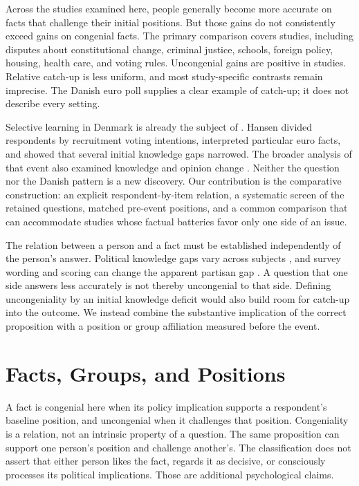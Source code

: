 \documentclass[11pt]{article}
\begin{document}
Across the studies examined here, people generally become more accurate on facts that challenge their initial positions. But those gains do not consistently exceed gains on congenial facts. The primary comparison covers \primaryStudies{} studies, including disputes about constitutional change, criminal justice, schools, foreign policy, housing, health care, and voting rules. Uncongenial gains are positive in \positiveGainStudies{} studies. Relative catch-up is less uniform, and most study-specific contrasts remain imprecise. The Danish euro poll supplies a clear example of catch-up; it does not describe every setting.

Selective learning in Denmark is already the subject of \citet[sec.~6.5, Table~6.8]{hansen2004}. Hansen divided respondents by recruitment voting intentions, interpreted particular euro facts, and showed that several initial knowledge gaps narrowed. The broader analysis of that event also examined knowledge and opinion change \citep{andersen2007}. Neither the question nor the Danish pattern is a new discovery. Our contribution is the comparative construction: an explicit respondent-by-item relation, a systematic screen of the retained questions, matched pre-event positions, and a common comparison that can accommodate studies whose factual batteries favor only one side of an issue.

The relation between a person and a fact must be established independently of the person's answer. Political knowledge gaps vary across subjects \citep{jerit2012,roush2023}, and survey wording and scoring can change the apparent partisan gap \citep{shen2025}. A question that one side answers less accurately is not thereby uncongenial to that side. Defining uncongeniality by an initial knowledge deficit would also build room for catch-up into the outcome. We instead combine the substantive implication of the correct proposition with a position or group affiliation measured before the event.

\section{Facts, Groups, and Positions}

A fact is congenial here when its policy implication supports a respondent's baseline position, and uncongenial when it challenges that position. Congeniality is a relation, not an intrinsic property of a question. The same proposition can support one person's position and challenge another's. The classification does not assert that either person likes the fact, regards it as decisive, or consciously processes its political implications. Those are additional psychological claims.
\end{document}
